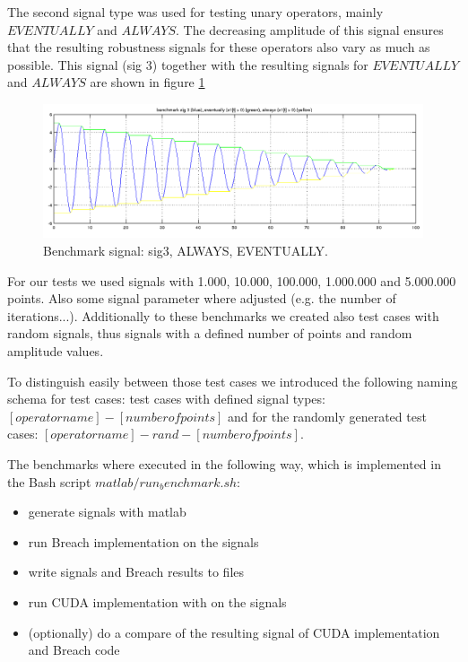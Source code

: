 \documentclass[a4paper,10pt]{article}
\begin{document}
The second signal type was used for testing unary operators, mainly $EVENTUALLY$ and $ALWAYS$. The decreasing amplitude of this signal ensures that the resulting robustness signals for these operators also vary as much as possible. This signal (sig 3) together with the resulting signals for $EVENTUALLY$ and $ALWAYS$ are shown in figure \ref{fig:sig3_evtl_alw}

\begin{figure}[H]
    \includegraphics[scale=0.3]{bm_sig3_ev_alw.png}
    \caption{
        \label{fig:sig3_evtl_alw}
        Benchmark signal: sig3, ALWAYS, EVENTUALLY.}
\end{figure}

For our tests we used signals with 1.000, 10.000, 100.000, 1.000.000 and 5.000.000 points. Also some signal parameter where adjusted (e.g. the number of iterations...). 
Additionally to these benchmarks we created also test cases with random signals, thus signals with a defined number of points and random amplitude values. 

To distinguish easily between those test cases we introduced the following naming schema for test cases: test cases with defined signal types: $[operator name]-[number of points]$ and for the randomly generated test cases: $[operator name]-rand-[number of points]$.

The benchmarks where executed in the following way, which is implemented in the Bash script $matlab/run_benchmark.sh$:
\begin{itemize}
	\item generate signals with matlab 
	\item run Breach implementation on the signals
	\item write signals and Breach results to files
	\item run CUDA implementation with on the signals
	\item (optionally) do a compare of the resulting signal of CUDA implementation and Breach code
\end{itemize}
\end{document}
